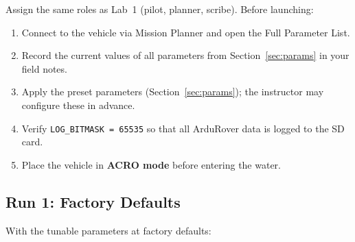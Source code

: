 \documentclass[../../book.tex]{subfiles}
\begin{document}
Assign the same roles as Lab~1 (pilot, planner, scribe).  Before launching:

\begin{enumerate}
  \item Connect to the vehicle via Mission Planner and open the Full Parameter List.
  \item Record the current values of all parameters from Section~\ref{sec:params} in your field notes.
  \item Apply the preset parameters (Section~\ref{sec:params}); the instructor may configure these in advance.
  \item Verify \texttt{LOG\_BITMASK = 65535} so that all ArduRover data is logged to the SD card.
  \item Place the vehicle in \textbf{ACRO mode} before entering the water.
\end{enumerate}

\subsection{Run 1: Factory Defaults}

With the tunable parameters at factory defaults:
\end{document}
